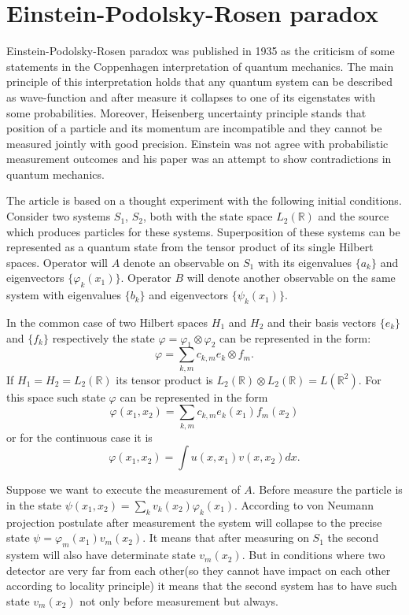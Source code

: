 \documentclass[11pt]{article}
\begin{document}
\section{Einstein-Podolsky-Rosen paradox}
Einstein-Podolsky-Rosen paradox was published in 1935 as the criticism of some statements in the Coppenhagen interpretation of quantum mechanics. The main principle of this interpretation holds that any quantum system can be described as wave-function and after measure it collapses to one of its eigenstates with some probabilities. Moreover, Heisenberg uncertainty principle stands that position of a particle and its momentum are incompatible and they cannot be measured jointly with good precision. Einstein was not agree with probabilistic measurement outcomes and his paper was an attempt to show contradictions in quantum mechanics.

The article is based on a thought experiment with the following initial conditions. Consider two systems $S_1$, $S_2$, both with the state space $L_2(\mathbb{R})$ and the source which produces particles for these systems. Superposition of these systems can be represented as a quantum state from the tensor product of its single Hilbert spaces.
Operator will $A$ denote an observable on $S_1$ with its eigenvalues $\{a_k\}$ and eigenvectors $\{\varphi_k(x_1)\}$. Operator $B$ will denote another observable on the same system with eigenvalues $\{b_k\}$ and eigenvectors $\{\psi_k(x_1)\}$. 

In the common case of two Hilbert spaces $H_1$ and $H_2$ and their basis vectors $\{e_k\}$ and $\{f_k\}$ respectively the state $\varphi = \varphi_1\otimes\varphi_2$ can be represented in the form:
\[
\varphi = \sum_{k, m}c_{k, m}e_k\otimes f_m.
\]
If $H_1 = H_2 = L_2(\mathbb{R})$ its tensor product is $L_2(\mathbb{R})\otimes L_2(\mathbb{R}) = L(\mathbb{R}^2)$. For this space such state $\varphi$ can be represented in the form
\[
\varphi (x_1, x_2) = \sum_{k, m}c_{k, m}e_k(x_1)f_m(x_2)
\]
or for the continuous case it is
\[
\varphi (x_1, x_2) = \int u(x, x_1)v(x, x_2)dx.
\]

Suppose we want to execute the measurement of $A$. Before measure the particle is in the state $\psi(x_1, x_2) = \sum_k v_k(x_2)\varphi_k(x_1)$. According to von Neumann projection postulate after measurement the system will collapse to the precise state $\psi = \varphi_m(x_1)v_m(x_2)$. It means that after measuring on $S_1$ the second system will also have determinate state $v_m(x_2)$. But in conditions where two detector are very far from each other(so they cannot have impact on each other according to locality principle) it means that the second system has to have such state $v_m(x_2)$ not only before measurement but always.
\end{document}
